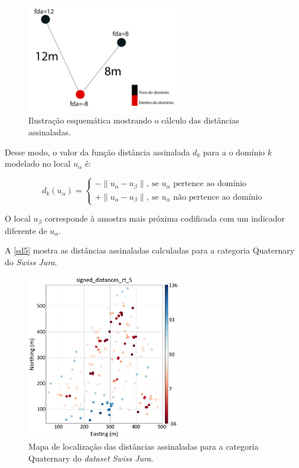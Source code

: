 \begin{figure}[H]
    \centering
	\caption{\label{2d_ex}Ilustração esquemática mostrando o cálculo das distâncias assinaladas.}
	\includegraphics[width=0.6\textwidth]{capitulo_2/imagens/2d_ex.jpg}
\end{figure}

Desse modo, o valor da função distância assinalada $d_k$ para a o domínio $k$ modelado no local $u_\alpha$ é:

\begin{equation}
	d_k(u_\alpha)=\begin{cases}
	-\parallel u_\alpha-u_\beta\parallel,\:\textrm{se $u_\alpha$ pertence ao domínio}\\
	+\parallel u_\alpha-u_\beta\parallel,\:\textrm{se $u_\alpha$ não pertence ao domínio}\end{cases}
    \label{eq_mult_sg}
\end{equation}

O local $u_\beta$ corresponde à amostra mais próxima codificada com um indicador diferente de $u_\alpha$.

A \autoref{sd5} mostra as distâncias assinaladas calculadas para a categoria Quaternary do \textit{Swiss Jura}.

\begin{figure}[H]
	\centering
	\caption{\label{sd5}Mapa de localização das distâncias assinaladas para a categoria Quaternary do \textit{dataset} \textit{Swiss Jura}.}
	\includegraphics[width=0.6\textwidth]{capitulo_2/imagens/sd5.png}
\end{figure}

